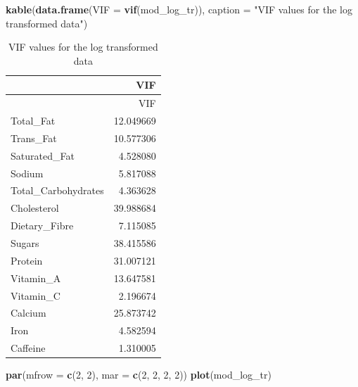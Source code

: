 \documentclass[
]{article}
\newenvironment{Shaded}{\begin{snugshade}}{\end{snugshade}}
\newcommand{\AttributeTok}[1]{\textcolor[rgb]{0.13,0.29,0.53}{#1}}
\newcommand{\DecValTok}[1]{\textcolor[rgb]{0.00,0.00,0.81}{#1}}
\newcommand{\FunctionTok}[1]{\textcolor[rgb]{0.13,0.29,0.53}{\textbf{#1}}}
\newcommand{\NormalTok}[1]{#1}
\newcommand{\StringTok}[1]{\textcolor[rgb]{0.31,0.60,0.02}{#1}}
\begin{document}
\begin{Shaded}
\begin{Highlighting}[]
\FunctionTok{kable}\NormalTok{(}\FunctionTok{data.frame}\NormalTok{(}\AttributeTok{VIF =} \FunctionTok{vif}\NormalTok{(mod\_log\_tr)),}
      \AttributeTok{caption =} \StringTok{"VIF values for the log transformed data"}\NormalTok{)}
\end{Highlighting}
\end{Shaded}

\begin{longtable}[]{@{}lr@{}}
\caption{VIF values for the log transformed data}\tabularnewline
\toprule\noalign{}
& VIF \\
\midrule\noalign{}
\endfirsthead
\toprule\noalign{}
& VIF \\
\midrule\noalign{}
\endhead
\bottomrule\noalign{}
\endlastfoot
Total\_Fat & 12.049669 \\
Trans\_Fat & 10.577306 \\
Saturated\_Fat & 4.528080 \\
Sodium & 5.817088 \\
Total\_Carbohydrates & 4.363628 \\
Cholesterol & 39.988684 \\
Dietary\_Fibre & 7.115085 \\
Sugars & 38.415586 \\
Protein & 31.007121 \\
Vitamin\_A & 13.647581 \\
Vitamin\_C & 2.196674 \\
Calcium & 25.873742 \\
Iron & 4.582594 \\
Caffeine & 1.310005 \\
\end{longtable}

\begin{Shaded}
\begin{Highlighting}[]
\FunctionTok{par}\NormalTok{(}\AttributeTok{mfrow =} \FunctionTok{c}\NormalTok{(}\DecValTok{2}\NormalTok{, }\DecValTok{2}\NormalTok{), }\AttributeTok{mar =} \FunctionTok{c}\NormalTok{(}\DecValTok{2}\NormalTok{, }\DecValTok{2}\NormalTok{, }\DecValTok{2}\NormalTok{, }\DecValTok{2}\NormalTok{))}
\FunctionTok{plot}\NormalTok{(mod\_log\_tr)}
\end{Highlighting}
\end{Shaded}
\end{document}
